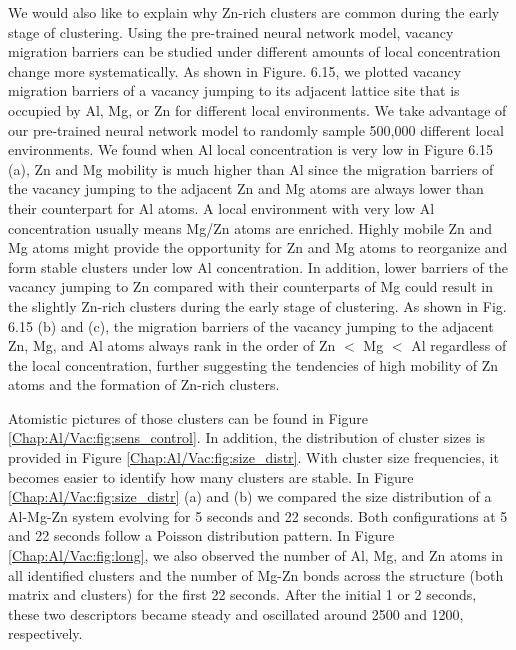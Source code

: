 We would also like to explain why Zn-rich clusters are common during the early stage of clustering. Using the pre-trained neural network model, vacancy migration barriers can be studied under different amounts of local concentration change more systematically. As shown in Figure. 6.15, we plotted vacancy migration barriers of a vacancy jumping to its adjacent lattice site that is occupied by Al, Mg, or Zn for different local environments. We take advantage of our pre-trained neural network model to randomly sample 500,000 different local environments. We found when Al local concentration is very low in Figure 6.15 (a), Zn and Mg mobility is much higher than Al since the migration barriers of the vacancy jumping to the adjacent Zn and Mg atoms are always lower than their counterpart for Al atoms. A local environment with very low Al concentration usually means Mg/Zn atoms are enriched. Highly mobile Zn and Mg atoms might provide the opportunity for Zn and Mg atoms to reorganize and form stable clusters under low Al concentration. In addition, lower barriers of the vacancy jumping to Zn compared with their counterparts of Mg could result in the slightly Zn-rich clusters during the early stage of clustering. As shown in Fig. 6.15 (b) and (c), the migration barriers of the vacancy jumping to the adjacent Zn, Mg, and Al atoms always rank in the order of Zn $<$ Mg $<$ Al regardless of the local concentration, further suggesting the tendencies of high mobility of Zn atoms and the formation of Zn-rich clusters.


Atomistic pictures of those clusters can be found in Figure \ref{Chap:Al/Vac:fig:sens_control}. In addition, the distribution of cluster sizes is provided in Figure \ref{Chap:Al/Vac:fig:size_distr}. With cluster size frequencies, it becomes easier to identify how many clusters are stable. In Figure \ref{Chap:Al/Vac:fig:size_distr} (a) and (b) we compared the size distribution of a Al-Mg-Zn system evolving for 5 seconds and 22 seconds. Both configurations at 5 and 22 seconds follow a Poisson distribution pattern. In Figure \ref{Chap:Al/Vac:fig:long}, we also observed the number of Al, Mg, and Zn atoms in all identified clusters and the number of Mg-Zn bonds across the structure (both matrix and clusters) for the first 22 seconds. After the initial 1 or 2 seconds, these two descriptors became steady and oscillated around 2500 and 1200, respectively.


